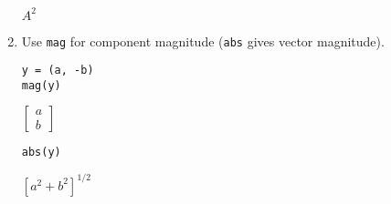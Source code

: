 \begin{enumerate}
$A^2$

\item
Use \verb$mag$ for component magnitude (\verb$abs$ gives vector magnitude).

{\color{blue}
\begin{verbatim}
y = (a, -b)
mag(y)
\end{verbatim}}

$\begin{bmatrix}a\\b\end{bmatrix}$

{\color{blue}
\begin{verbatim}
abs(y)
\end{verbatim}}

$\left[a^2+b^2\right]^{1/2}$

\end{enumerate}

